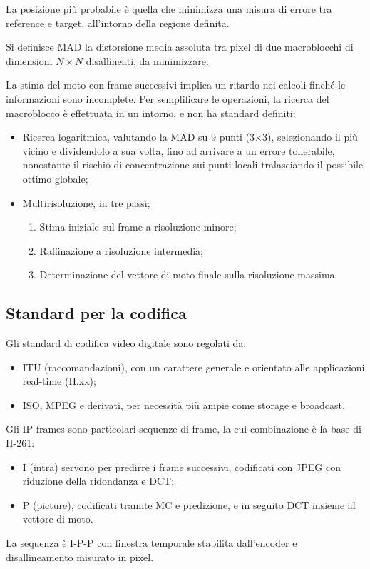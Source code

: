 La posizione più probabile è quella che minimizza una misura di errore tra reference e target, all'intorno della regione definita.

Si definisce MAD la distorsione media assoluta tra pixel di due macroblocchi di dimensioni $N \times N$ disallineati, da minimizzare.

La stima del moto con frame successivi implica un ritardo nei calcoli finché le informazioni sono incomplete. Per semplificare le operazioni, la ricerca del macroblocco è effettuata in un intorno, e non ha standard definiti:
\begin{itemize}
	\item Ricerca logaritmica, valutando la MAD su 9 punti (3$\times$3), selezionando il più vicino e dividendolo a sua volta, fino ad arrivare a un errore tollerabile, nonostante il rischio di concentrazione sui punti locali tralasciando il possibile ottimo globale;
	\item Multirisoluzione, in tre passi;
	\begin{enumerate}
		\item Stima iniziale sul frame a risoluzione minore;
		\item Raffinazione a risoluzione intermedia;
		\item Determinazione del vettore di moto finale sulla risoluzione massima.
	\end{enumerate}
\end{itemize}

\subsection{Standard per la codifica}
Gli standard di codifica video digitale sono regolati da:
\begin{itemize}
	\item ITU (raccomandazioni), con un carattere generale e orientato alle applicazioni real-time (H.xx);
	\item ISO, MPEG e derivati, per necessità più ampie come storage e broadcast.
\end{itemize}

Gli IP frames sono particolari sequenze di frame, la cui combinazione è la base di H-261:
\begin{itemize}
	\item I (intra) servono per predirre i frame successivi, codificati con JPEG con riduzione della ridondanza e DCT;
	\item P (picture), codificati tramite MC e predizione, e in seguito DCT insieme al vettore di moto.
\end{itemize}
La sequenza è I-P-P con finestra temporale stabilita dall'encoder e disallineamento misurato in pixel.

